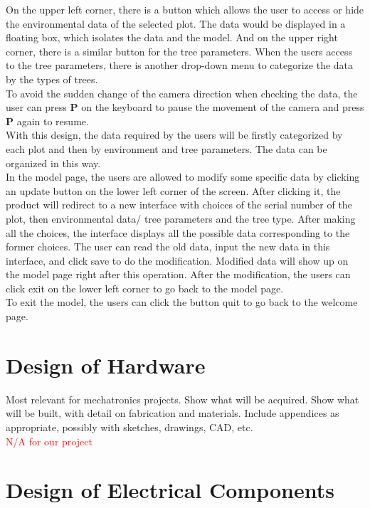 \documentclass[12pt, titlepage]{article}
\begin{document}
\noindent On the upper left corner, there is a button which allows the user to access or hide
the environmental data of the selected plot. The data would be displayed in a floating box,
which isolates the data and the model. And on the upper right corner, there is a similar
button for the tree parameters. When the users access to the tree parameters, there is another
drop-down menu to categorize the data by the types of trees. \\

\noindent To avoid the sudden change of the camera direction when checking the data, the user
can press \textbf{P} on the keyboard to pause the movement of the camera and press \textbf{P} again to resume. \\

\noindent With this design, the data required by the users will be firstly categorized by each plot and then by environment and tree parameters. The data can be organized in this way. \\

\noindent In the model page, the users are allowed to modify some specific data by clicking an update button on the lower left corner of the screen. After clicking it, the product will redirect to a new interface with choices of the serial number of the plot, then environmental data/ tree parameters and the tree type. After making all the choices, the interface displays all the possible data corresponding to the former choices. The user can read the old data, input the new data in this interface, and click save to do the modification. Modified data will show up on the model page right after this operation. After the modification, the users can click exit on the lower left corner to go back to the model page.\\

\noindent To exit the model, the users can click the button quit to go back to the welcome page. 


\section{Design of Hardware}

Most relevant for mechatronics projects. Show what will be acquired. Show what will be built, with detail on fabrication and materials. Include appendices as appropriate, possibly with sketches, drawings, CAD, etc. \\ \textcolor{red}{N/A for our project}

\section{Design of Electrical Components}
\end{document}
